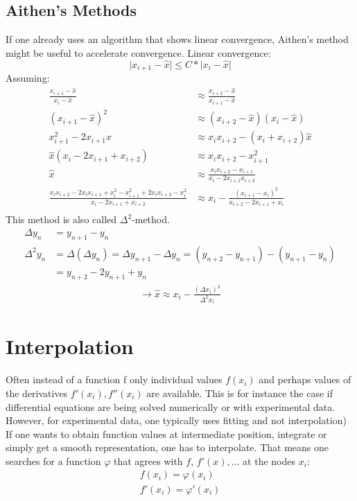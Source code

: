 \section{Aithen's Methods}\label{sec:aithen's-methods}
If one already uses an algorithm that shows linear convergence, Aithen's method might be useful to
accelerate convergence.
Linear convergence:
\begin{equation*}
    \lvert x_{i+1} - \hat{x} \rvert \leq C * \lvert x_i - \hat{x} \rvert
\end{equation*}
Assuming:
\begin{align*}
    \frac{ x_{i+1}-\hat{x} }{x_i - \hat{x}} &\approx
    \frac{ x_{i+2}-\hat{x}}{x_{i+1}-\hat{x}}\\
    (x_{i+1}-\hat{x})^2 &\approx (x_{i+2}-\hat{x})(x_i-\hat{x})\\
    x_{i+1}^2-2x_{i+1}\hat{x} &\approx x_i x_{i+2}-(x_i+x_{i+2})\hat{x}\\
    \hat{x}(x_i-2x_{i+1}+x_{i+2}) &\approx x_i x_{i+2}- x_{i+1}^2\\
    \hat{x} &\approx \frac{x_i x_{i+2}-x_{i+1}}{x_i-2x_{i+1} x_{i+2}}\\
    \frac{x_i x_{i+2}-2x_i x_{i+1}+x_i^2-x_{i+1}^2+2x_i x_{i+2}-x_i^2}{x_i-2x_{i+1}+x_{i+2}}&\approx x_i-\frac{(x_{i+1}-x_i)^2}{x_{i+2}-2x_{i+1}+x_i}\\
\end{align*}
This method is also called $\Delta^2$-method.
\begin{align*}
    \Delta y_n &= y_{n+1}-y_n\\
    \Delta^2 y_n &= \Delta(\Delta y_n) = \Delta y_{n+1}-\Delta y_n = (y_{n+2}-y_{n+1})-(y_{n+1}-y_n)\\
    &=y_{n+2} -2y_{n+1}+y_n
\end{align*}
\begin{align*}
    \to \hat{x}\approx x_i - \frac{(\Delta x_i)^2}{\Delta^2 x_i}
\end{align*}


\chapter{Interpolation}\label{ch:interpolation}
Often instead of a function f only individual values $f(x_i)$ and
perhaps values of the derivatives $f'(x_i), f''(x_i)$ are available.
This is for instance the case if differential equations are being solved
numerically or with experimental data.
However, for experimental data, one typically uses fitting and not interpolation)
If one wants to obtain function values at intermediate position, integrate or
simply get a smooth representation, one has to interpolate.
That means one searches for a function $\varphi$ that agrees with $f$, $f'(x), \ldots$
at the nodes $x_i$:
\begin{align*}
    f(x_i)=\varphi(x_i)\\
    f'(x_i)=\varphi'(x_i)
\end{align*}


